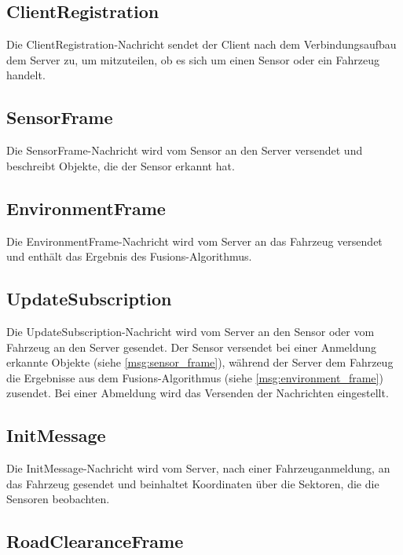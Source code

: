 \subsection{ClientRegistration}
\label{msg:client_registration}


Die ClientRegistration-Nachricht sendet der Client nach dem Verbindungsaufbau dem Server zu, um mitzuteilen, ob es sich um einen Sensor oder ein Fahrzeug handelt.

\subsection{SensorFrame}
\label{msg:sensor_frame}

Die SensorFrame-Nachricht wird vom Sensor an den Server versendet und beschreibt Objekte, die der Sensor erkannt hat.

\subsection{EnvironmentFrame}
\label{msg:environment_frame}

Die EnvironmentFrame-Nachricht wird vom Server an das Fahrzeug versendet und enthält das Ergebnis des Fusions-Algorithmus.

\subsection{UpdateSubscription}

Die UpdateSubscription-Nachricht wird vom Server an den Sensor oder vom Fahrzeug an den Server gesendet.
Der Sensor versendet bei einer Anmeldung erkannte Objekte (siehe \autoref{msg:sensor_frame}), während der Server dem Fahrzeug die Ergebnisse aus dem Fusions-Algorithmus (siehe \autoref{msg:environment_frame}) zusendet.
Bei einer Abmeldung wird das Versenden der Nachrichten eingestellt.

\subsection{InitMessage}

Die InitMessage-Nachricht wird vom Server, nach einer Fahrzeuganmeldung, an das Fahrzeug gesendet und beinhaltet Koordinaten über die Sektoren, die die Sensoren beobachten.

\subsection{RoadClearanceFrame}

